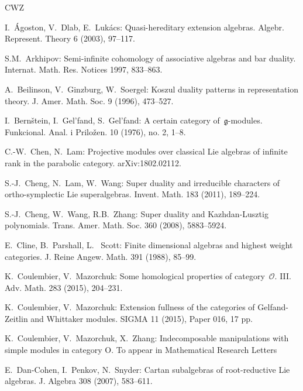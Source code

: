 \documentclass[11pt]{amsart}
\newcommand{\cO}{\mathcal O}
\numberwithin{equation}{section}
\theoremstyle{plain}
\theoremstyle{remark}
\theoremstyle{remark}
\theoremstyle{construction}
\begin{document}
\begin{thebibliography}
	{CWZ}
	
	I.~\'Agoston, V.~Dlab, E.~Luk\'acs:
Quasi-hereditary extension algebras.
Algebr. Represent. Theory 6 (2003),  97--117.
	
	S.M.~Arkhipov:
Semi-infinite cohomology of associative algebras and bar duality. 
Internat. Math. Res. Notices 1997, 833--863.



A.~Beilinson, V.~Ginzburg, W.~Soergel:
Koszul duality patterns in representation theory.
J. Amer. Math. Soc. 9 (1996),  473--527.


I.~Bern\v{s}tein, I.~Gel'fand, S.~Gel'fand:
A certain category of~$\mathfrak{g}$-modules.
Funkcional. Anal. i Prilo\v{z}en. { 10} (1976), no. 2, 1--8. 


C.-W.~Chen, N.~Lam: 
Projective modules over classical Lie algebras of infinite rank in the parabolic category.
arXiv:1802.02112.

S.-J.~Cheng, N.~Lam, W.~Wang:
Super duality and irreducible characters of ortho-symplectic Lie superalgebras.
Invent. Math. 183 (2011), 189--224.

S.-J.~Cheng, W.~Wang, R.B.~Zhang:
Super duality and Kazhdan-Lusztig polynomials.
Trans. Amer. Math. Soc. 360 (2008),  5883--5924. 

E.~Cline, B.~Parshall, L.~ Scott:
Finite dimensional algebras and highest weight categories. 
J. Reine Angew. Math. 391 (1988), 85--99. 




K.~Coulembier, V.~Mazorchuk: 
Some homological properties of category~$\cO$. III. Adv. Math. 283 (2015), 204--231.

K.~Coulembier, V.~Mazorchuk:
Extension fullness of the categories of Gelfand-Zeitlin and Whittaker modules.
SIGMA 11 (2015), Paper 016, 17 pp.

K.~Coulembier, V.~Mazorchuk, X.~Zhang: 
Indecomposable manipulations with simple modules in category O.
To appear in Mathematical Research Letters




E.~Dan-Cohen, I.~Penkov, N.~Snyder: Cartan subalgebras of root-reductive Lie algebras. J. Algebra 308 (2007),  583--611.





\end{thebibliography}
\end{document}
